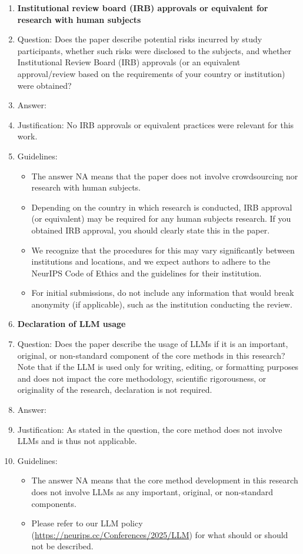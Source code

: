 \documentclass{article}
\theoremstyle{plain}
\theoremstyle{definition}
\theoremstyle{remark}
\begin{document}
\begin{enumerate}
\item {\bf Institutional review board (IRB) approvals or equivalent for research with human subjects}
    \item[] Question: Does the paper describe potential risks incurred by study participants, whether such risks were disclosed to the subjects, and whether Institutional Review Board (IRB) approvals (or an equivalent approval/review based on the requirements of your country or institution) were obtained?
    \item[] Answer: \answerNA{} %
    \item[] Justification: No IRB approvals or equivalent practices were relevant for this work.
    \item[] Guidelines:
    \begin{itemize}
        \item The answer NA means that the paper does not involve crowdsourcing nor research with human subjects.
        \item Depending on the country in which research is conducted, IRB approval (or equivalent) may be required for any human subjects research. If you obtained IRB approval, you should clearly state this in the paper. 
        \item We recognize that the procedures for this may vary significantly between institutions and locations, and we expect authors to adhere to the NeurIPS Code of Ethics and the guidelines for their institution. 
        \item For initial submissions, do not include any information that would break anonymity (if applicable), such as the institution conducting the review.
    \end{itemize}

\item {\bf Declaration of LLM usage}
    \item[] Question: Does the paper describe the usage of LLMs if it is an important, original, or non-standard component of the core methods in this research? Note that if the LLM is used only for writing, editing, or formatting purposes and does not impact the core methodology, scientific rigorousness, or originality of the research, declaration is not required.
    \item[] Answer: \answerNA{} %
    \item[] Justification: As stated in the question, the core method does not involve LLMs and is thus not applicable.
    \item[] Guidelines:
    \begin{itemize}
        \item The answer NA means that the core method development in this research does not involve LLMs as any important, original, or non-standard components.
        \item Please refer to our LLM policy (\url{https://neurips.cc/Conferences/2025/LLM}) for what should or should not be described.
    \end{itemize}

\end{enumerate}
\end{document}
